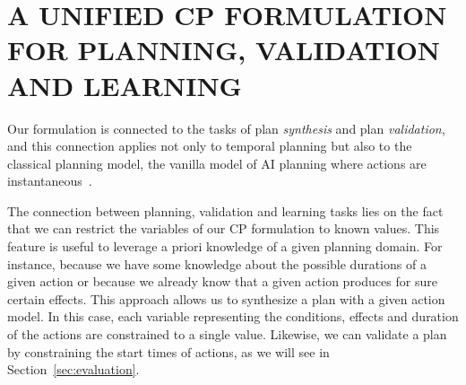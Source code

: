 \documentclass{ecai}
\newcommand{\cond}{\mathsf{cond}}  %
\newcommand{\start}{\mathsf{start}}%
\newcommand{\en}{\mathsf{end}}     %
\newcommand{\reqs}{\mathsf{req\_{start}}} %
\newcommand{\reqe}{\mathsf{req\_{end}}}   %
\begin{document}








\section{A UNIFIED CP FORMULATION FOR PLANNING, VALIDATION AND LEARNING}
\label{sec:usingCPValidation}


Our formulation is connected to the tasks of plan {\em synthesis} and plan {\em validation}, and this connection applies not only to temporal planning but also to the classical planning model, the vanilla model of AI planning where actions are instantaneous~\cite{geffner2013concise}. 

The connection between planning, validation and learning tasks lies on the fact that we can restrict the variables of our CP formulation to known values. This feature is useful to leverage a priori knowledge of a given planning domain. For instance, because we have some knowledge about the possible durations of a given action or because we already know that a given action produces for sure certain effects. This approach allows us to synthesize a plan with a given action model. In this case, each variable representing the conditions, effects and duration of the actions are constrained to a single value. Likewise, we can validate a plan by constraining the start times of actions, as we will see in Section~\ref{sec:evaluation}.
\end{document}
